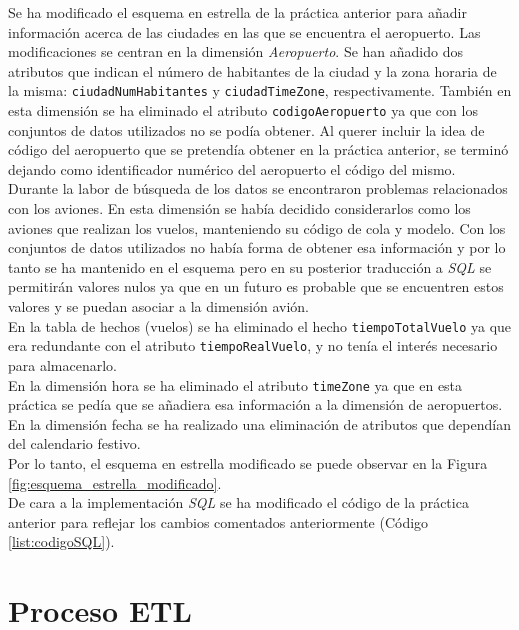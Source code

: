 \documentclass{article}
\begin{document}
Se ha modificado el esquema en estrella de la práctica anterior para añadir información acerca de las ciudades en las que se encuentra el aeropuerto. Las modificaciones se centran en la dimensión \textit{Aeropuerto}. Se han añadido dos atributos que indican el número de habitantes de la ciudad y la zona horaria de la misma: \texttt{ciudadNumHabitantes} y \texttt{ciudadTimeZone}, respectivamente. También en esta dimensión se ha eliminado el atributo \texttt{codigoAeropuerto} ya que con los conjuntos de datos utilizados no se podía obtener. Al querer incluir la idea de código del aeropuerto que se pretendía obtener en la práctica anterior, se terminó dejando como identificador numérico del aeropuerto el código del mismo.\\
Durante la labor de búsqueda de los datos se encontraron problemas relacionados con los aviones. En esta dimensión se había decidido considerarlos como los aviones que realizan los vuelos, manteniendo su código de cola y modelo. Con los conjuntos de datos utilizados no había forma de obtener esa información y por lo tanto se ha mantenido en el esquema pero en su posterior traducción a \textit{SQL} se permitirán valores nulos ya que en un futuro es probable que se encuentren estos valores y se puedan asociar a la dimensión avión.\\
En la tabla de hechos (vuelos) se ha eliminado el hecho \texttt{tiempoTotalVuelo} ya que era redundante con el atributo \texttt{tiempoRealVuelo}, y no tenía el interés necesario para almacenarlo.\\
En la dimensión hora se ha eliminado el atributo \texttt{timeZone} ya que en esta práctica se pedía que se añadiera esa información a la dimensión de aeropuertos.\\
En la dimensión fecha se ha realizado una eliminación de atributos que dependían del calendario festivo.\\
Por lo tanto, el esquema en estrella modificado se puede observar en la Figura \ref{fig:esquema_estrella_modificado}.\\

De cara a la implementación \textit{SQL} se ha modificado el código de la práctica anterior para reflejar los cambios comentados anteriormente (Código \ref{list:codigoSQL}).\\

\newpage
\section{Proceso ETL}
\end{document}
